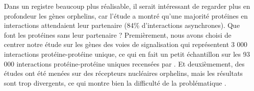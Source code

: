 \par Dans un registre beaucoup plus réalisable, il serait intéressant de regarder plus en profondeur les gènes orphelins, car l’étude a montré qu’une majorité protéines en interactions attendaient leur partenaire (84\% d’interactions asynchrones). Que font les protéines sans leur partenaire ? Premièrement, nous avons choisi de centrer notre étude sur les gènes des voies de signalisation qui représentent 3 000 interactions protéine-protéine unique, ce qui en fait un petit échantillon sur les 93 000 interactions protéine-protéine uniques recensées par \cite{luck_proteome-scale_2017}. Et deuxièmement, des études ont été menées sur des récepteurs nucléaires orphelins, mais les résultats sont trop divergents, ce qui montre bien la difficulté de la problématique \parencite{markov_origin_2011}. 

\newpage
